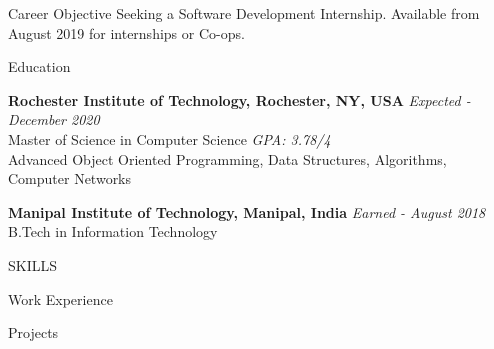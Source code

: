 \documentclass{resume} %
\begin{document}
    \begin{rSection}{Career Objective}
     Seeking a Software Development Internship. Available from August 2019 for internships or Co-ops.
    \end{rSection}

    \begin{rSection}{Education}
    
        {\bf Rochester Institute of Technology, Rochester, NY, USA} \hfill {\em Expected - December 2020} 
        \\ Master of Science in Computer Science 
        \hfill {\em GPA: 3.78/4} \\
        Advanced Object Oriented Programming, Data Structures, Algorithms, Computer Networks
        
        {\bf Manipal Institute of Technology, Manipal, India} 
        \hfill {\em Earned - August 2018} 
        \\ B.Tech in Information Technology
    \end{rSection}



    \begin{rSection}{SKILLS}
        
    \end{rSection}


    \begin{rSection}{Work Experience}
        
    \end{rSection}


    \begin{rSection}{Projects}
        
    \end{rSection}
\end{document}
